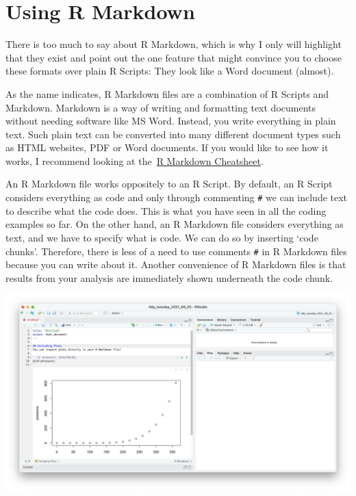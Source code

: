 \documentclass[
]{book}
\begin{document}
\hypertarget{r-markdown-and-r-notebooks}{%
\section{Using R Markdown}\label{r-markdown-and-r-notebooks}}

There is too much to say about R Markdown, which is why I only will highlight that they exist and point out the one feature that might convince you to choose these formats over plain R Scripts: They look like a Word document (almost).

As the name indicates, R Markdown files are a combination of R Scripts and Markdown. Markdown is a way of writing and formatting text documents without needing software like MS Word. Instead, you write everything in plain text. Such plain text can be converted into many different document types such as HTML websites, PDF or Word documents. If you would like to see how it works, I recommend looking at the~\href{https://www.rstudio.com/resources/cheatsheets/}{R Markdown Cheatsheet}.

An R Markdown file works oppositely to an R Script. By default, an R Script considers everything as code and only through commenting \texttt{\#} we can include text to describe what the code does. This is what you have seen in all the coding examples so far. On the other hand, an R Markdown file considers everything as text, and we have to specify what is code. We can do so by inserting `code chunks'. Therefore, there is less of a need to use comments \texttt{\#} in R Markdown files because you can write about it. Another convenience of R Markdown files is that results from your analysis are immediately shown underneath the code chunk.

\includegraphics{images/chapter_06_img/03_r_markdown/01_r_markdown_plain.png}
\end{document}
